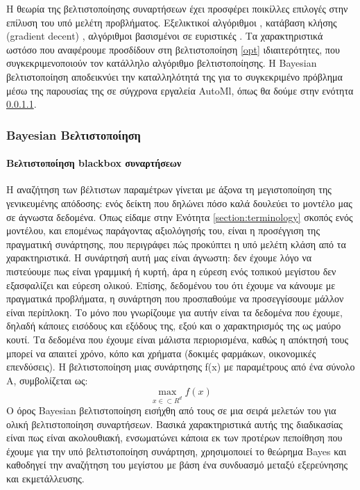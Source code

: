 	Η θεωρία της βελτιστοποίησης συναρτήσεων έχει προσφέρει ποικίλλες επιλογές στην επίλυση του υπό μελέτη προβλήματος. Eξελικτικοί αλγόριθμοι \citep{1554741}, κατάβαση κλήσης (gradient decent) \citep{wassenberg},  αλγόριθμοι \citep{Huang2006} βασισμένοι σε ευριστικές \citep{Nelder01011965}. Τα χαρακτηριστικά ωστόσο που αναφέρουμε προσδίδουν στη βελτιστοποίηση \ref{opt} ιδιαιτερότητες, που συγκεκριμενοποιούν τον κατάλληλο αλγόριθμο βελτιστοποίησης. Η Bayesian βελτιστοποίηση αποδεικνύει την καταλληλότητά της για το συγκεκριμένο πρόβλημα μέσω της παρουσίας της σε σύγχρονα εργαλεία AutoMl, όπως θα δούμε στην ενότητα \ref{}.
 \subsubsection{Bayesian Βελτιστοποίηση}
 	\paragraph{Βελτιστοποίηση blackbox συναρτήσεων} Η αναζήτηση των βέλτιστων παραμέτρων γίνεται με άξονα τη μεγιστοποίηση της γενικευμένης απόδοσης: ενός δείκτη που δηλώνει πόσο καλά δουλεύει το μοντέλο μας σε άγνωστα δεδομένα. Όπως είδαμε στην Ενότητα \ref{section:terminology} σκοπός ενός μοντέλου, και επομένως παράγοντας αξιολόγησής του, είναι η προσέγγιση της πραγματική συνάρτησης, που περιγράφει πώς προκύπτει η υπό μελέτη κλάση από τα χαρακτηριστικά. Η συνάρτησή αυτή μας είναι άγνωστη: δεν έχουμε λόγο να πιστεύουμε πως είναι γραμμική ή κυρτή, άρα η εύρεση ενός τοπικού μεγίστου δεν εξασφαλίζει και εύρεση ολικού. Επίσης, δεδομένου του ότι έχουμε να κάνουμε με πραγματικά προβλήματα, η συνάρτηση που προσπαθούμε να προσεγγίσουμε μάλλον είναι περίπλοκη. Το μόνο που γνωρίζουμε για αυτήν είναι τα δεδομένα που έχουμε, δηλαδή κάποιες εισόδους και εξόδους της, εξού και ο χαρακτηρισμός της ως μαύρο κουτί. Τα δεδομένα που έχουμε είναι μάλιστα περιορισμένα, καθώς η απόκτησή τους μπορεί να απαιτεί χρόνο, κόπο και χρήματα (δοκιμές φαρμάκων, οικονομικές επενδύσεις). Η βελτιστοποίηση μιας συνάρτησης f(x) με παραμέτρους από ένα σύνολο A, συμβολίζεται ως:
 	$$\max_{x \in \subset R^d } f(x)$$
 	Ο όρος Bayesian βελτιστοποίηση εισήχθη από τους \citet{Mockus1991} σε μια σειρά μελετών του για ολική βελτιστοποίηση συναρτήσεων. Βασικά χαρακτηριστικά αυτής της διαδικασίας είναι πως είναι ακολουθιακή, ενσωματώνει κάποια εκ των προτέρων πεποίθηση που έχουμε για την υπό βελτιστοποίηση συνάρτηση, χρησιμοποιεί το θεώρημα Bayes και καθοδηγεί την αναζήτηση του μεγίστου με βάση ένα συνδυασμό μεταξύ εξερεύνησης και εκμετάλλευσης.
